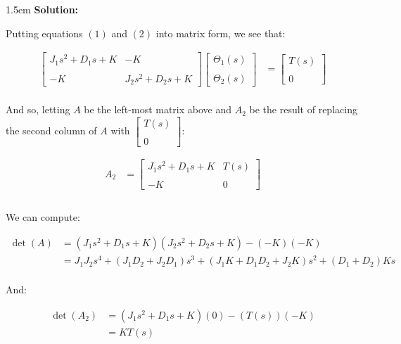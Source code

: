\documentclass{article}
\newenvironment{solution}{
	\vspace{.5em}
	\par
	\begin{adjustwidth}{1.5em}{}
	\textbf{{Solution:}}
	\par
	\vspace{.5em}
}{
	\vspace{1em}
	\end{adjustwidth}
}
\begin{document}
\begin{solution}
	Putting equations $(1)$ and $(2)$ into matrix form, we see that:

	\begin{align*}
		\begin{bmatrix} J_1 s^2 + D_1 s + K & -K \\\\ -K & J_2 s^2 + D_2 s + K \end{bmatrix} \begin{bmatrix} \Theta_1(s) \\\\ \Theta_2(s) \end{bmatrix} &= \begin{bmatrix} T(s) \\\\ 0 \end{bmatrix} \\
	\end{align*}

	And so, letting $A$ be the left-most matrix above and $A_2$ be the result of replacing the second column of $A$ with $\begin{bmatrix} T(s) \\\\ 0 \end{bmatrix}$:

	\begin{align*}
		A_2 &= \begin{bmatrix} J_1 s^2 + D_1 s + K & T(s) \\\\ -K & 0 \end{bmatrix} \\\\
	\end{align*}

	We can compute:

	\begin{align*}
		\det(A) &= (J_1 s^2 + D_1 s + K)(J_2 s^2 + D_2 s + K) - (-K)(-K) \\
			&= J_1 J_2 s^4 + (J_1 D_2 + J_2 D_1) s^3 + (J_1 K + D_1 D_2 + J_2 K) s^2 + (D_1 + D_2) K s \\
	\end{align*}

	And:

	\begin{align*}
		\det(A_2) &= (J_1 s^2 + D_1 s + K)(0) - (T(s))(-K) \\
			&= K T(s) \\
	\end{align*}


\end{solution}
\end{document}
